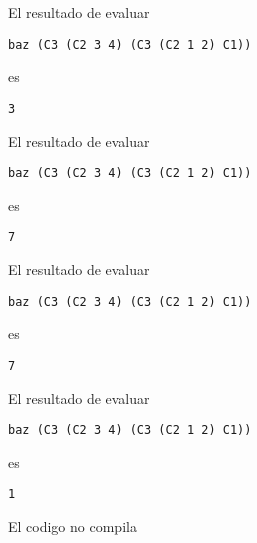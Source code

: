 \documentclass{gift}
\begin{document}
\begin{giftMO}
\item \begin{giftFragmento}
El resultado de evaluar\end  {giftFragmento}

\verb!baz (C3 (C2 3 4) (C3 (C2 1 2) C1))!
\begin{giftFragmento}
es\end  {giftFragmento}

\verb!3!
\begin{giftFragmento}
\end  {giftFragmento}


\item \begin{giftFragmento}
El resultado   de evaluar\end  {giftFragmento}

\verb!baz (C3 (C2 3 4) (C3 (C2 1 2) C1))!
\begin{giftFragmento}
es\end  {giftFragmento}

\verb!7!
\begin{giftFragmento}
\end  {giftFragmento}


\item \begin{giftFragmento}
El   resultado de   evaluar\end  {giftFragmento}

\verb!baz (C3 (C2 3 4) (C3 (C2 1 2) C1))!
\begin{giftFragmento}
es\end  {giftFragmento}

\verb!7!
\begin{giftFragmento}
\end  {giftFragmento}


\item \begin{giftFragmento}
El resultado de evaluar\end  {giftFragmento}

\verb!baz (C3 (C2 3 4) (C3 (C2 1 2) C1))!
\begin{giftFragmento}
es\end  {giftFragmento}

\verb!1!
\begin{giftFragmento}
\end  {giftFragmento}


\item \begin{giftFragmento}
El codigo no compila\end  {giftFragmento}


\end  {giftMO}
\end{document}
